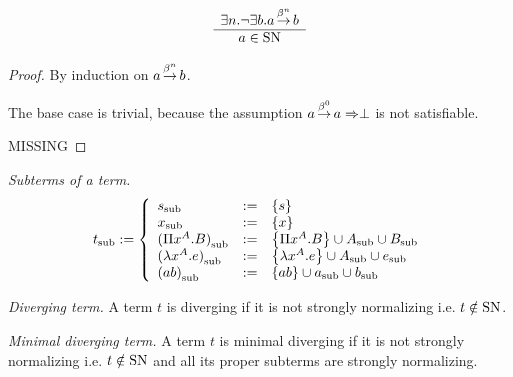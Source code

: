 \begin{theorem}
    $$
    \begin{array}{c} 
        \exists n. \lnot \exists b. a {{{\,\stackrel{{\beta}^{n}}{\to}\,}}} b
     \\ \hline 
        a \in {\text{SN}}
    \end{array}
    $$
    \begin{proof}

        By induction on $a {{{\,\stackrel{{\beta}^{n}}{\to}\,}}} b$.

        The base case is trivial, because the assumption $a {{{\,\stackrel{{\beta}^{0}}{\to}\,}}} a \Rightarrow
        \perp$ is not satisfiable.

        MISSING
    \end{proof}
\end{theorem}







\begin{definition}
    \emph{Subterms of a term.}
    $$
    {{t}_{\text{sub}}} :=
    \left\{ \begin{array}{llll} 
        {{s}_{\text{sub}}} &:=& {\left\{s\right\}}
        \\
        {{x}_{\text{sub}}} &:=& {\left\{x\right\}}
        \\
        {{(\Pi x^A.B)}_{\text{sub}}} &:=&
            {\left\{\Pi x^A. B\right\}} \cup {{A}_{\text{sub}}} \cup {{B}_{\text{sub}}}
        \\
        {{(\lambda x^A.e)}_{\text{sub}}} &:=&
            {\left\{\lambda x^A. e\right\}} \cup {{A}_{\text{sub}}} \cup {{e}_{\text{sub}}}
        \\
        {{(a b)}_{\text{sub}}} &:=&
            {\left\{ab\right\}} \cup {{a}_{\text{sub}}} \cup {{b}_{\text{sub}}}
     \end{array} \right.
    $$
\end{definition}







\begin{definition}
    \emph{Diverging term.} A term $t$ is diverging if it is not strongly
    normalizing i.e. $t \notin {\text{SN}}$.
\end{definition}





\begin{definition}
    \emph{Minimal diverging term.} A term $t$ is minimal diverging if it is not
    strongly normalizing i.e. $t \notin {\text{SN}}$ and all its proper subterms are
    strongly normalizing.
\end{definition}




